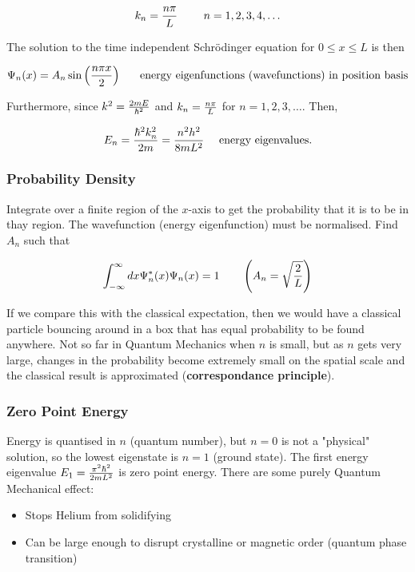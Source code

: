 \documentclass[english, 11pt]{article}
\begin{document}
\begin{itemize}
        \[ k_n = \frac{n\pi}{L} \ \ \ \ \ \ \ n = 1, 2, 3, 4, \ldots \]

        The solution to the time independent Schrödinger equation for $0 \leq x \leq L$ is then

        \[ \Psi_n(x) = A_n\sin \left( \frac{n\pi x}{2} \right) \ \ \ \ \ \mbox{energy eigenfunctions (wavefunctions) in position basis} \]

        Furthermore, since $k^2 = \frac{2mE}{\hbar^2}$ and $k_n = \frac{n\pi}{L}$ for $n = 1, 2, 3, \ldots$. Then,

        \[ E_n = \frac{\hbar^2k_n^2}{2m} = \frac{n^2h^2}{8mL^2} \ \ \ \ \mbox{energy eigenvalues.} \]

    \end{itemize}

    \subsubsection{Probability Density}

      Integrate over a finite region of the $x$-axis to get the probability that it is to be in thay region. The wavefunction (energy eigenfunction) must be normalised. Find $A_n$ such that

      \[ \int_{-\infty}^{\infty} dx \Psi_n^*(x)\Psi_n(x) = 1 \ \ \ \ \ \ \left( A_n = \sqrt{\frac{2}{L}} \right) \]

      If we compare this with the classical expectation, then we would have a classical particle bouncing around in a box that has equal probability to be found anywhere. Not so far in Quantum Mechanics when $n$ is small, but as $n$ gets very large, changes in the probability become extremely small on the spatial scale and the classical result is approximated (\textbf{correspondance principle}).

    \subsubsection{Zero Point Energy}

      Energy is quantised in $n$ (quantum number), but $n = 0$ is not a "physical" solution, so the lowest eigenstate is $n=1$ (ground state). The first energy eigenvalue $E_1 = \frac{\pi^2\hbar^2}{2mL^2}$ is zero point energy. There are some purely Quantum Mechanical effect:

      \begin{itemize}
        \item Stops Helium from solidifying
        \item Can be large enough to disrupt crystalline or magnetic order (quantum phase transition)
      \end{itemize}
\end{document}
